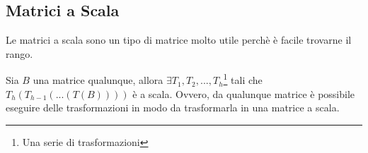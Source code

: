 \subsection{Matrici a Scala}
Le matrici a scala sono un tipo di matrice molto utile perchè è facile trovarne il rango.

Sia $B$ una matrice qualunque, allora $\exists T_1,T_2,...,T_h$\footnote{Una serie di trasformazioni} tali che
$T_h(T_{h-1}(...(T(B))))$ è a scala. Ovvero, da qualunque matrice è possibile eseguire delle trasformazioni in modo da trasformarla in una matrice a scala.


